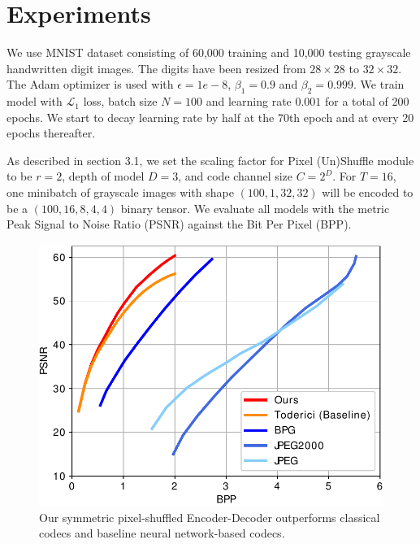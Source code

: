 \documentclass[10pt,twocolumn,letterpaper]{article}
\begin{document}
\section{Experiments}
We use MNIST dataset \cite{lecun1998gradient} consisting of 60,000 training and 10,000 testing grayscale handwritten digit images. The digits have been resized from $28 \times 28$ to $32 \times 32$. The Adam optimizer \cite{kingma2014adam} is used with $\epsilon = 1e-8$, $\beta_1 = 0.9$ and $\beta_2 = 0.999$. We train model with $\mathcal{L}_1$ loss, batch size $N=100$ and learning rate $0.001$ for a total of 200 epochs. We start to decay learning rate by half at the 70th epoch and at every 20 epochs thereafter.

As described in section 3.1, we set the scaling factor for Pixel (Un)Shuffle module to be $r=2$, depth of model $D=3$, and code channel size $C=2^D$. For $T=16$, one minibatch of grayscale images with shape $(100,1,32,32)$ will be encoded to be a $(100,16,8,4,4)$ binary tensor. We evaluate all models with the metric Peak Signal to Noise Ratio (PSNR) against the Bit Per Pixel (BPP).

\begin{figure}[t]
\begin{center}
\includegraphics[width=0.8\linewidth]{codec.pdf}
\end{center}
	\vspace{-0.2cm}
   \caption{Our symmetric pixel-shuffled Encoder-Decoder outperforms classical codecs and baseline neural network-based codecs.}
   \vspace{-0.2cm}
\label{fig_3}
\end{figure}
\end{document}
